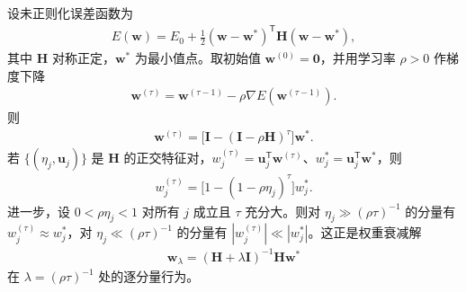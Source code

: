 \documentclass[../../main.tex]{subfiles}
\begin{document}
\begin{theorem}[早停与权重衰减的等价性]\label{theorem:ch09-早停等价}
设未正则化误差函数为
\begin{align*}
E(\boldsymbol{w})=E_{0}+\frac{1}{2}(\boldsymbol{w}-\boldsymbol{w}^{*})^{\mathsf T}\boldsymbol{H}(\boldsymbol{w}-\boldsymbol{w}^{*}),
\end{align*}
其中 $\boldsymbol{H}$ 对称正定，$\boldsymbol{w}^{*}$ 为最小值点。取初始值 $\boldsymbol{w}^{(0)}=\boldsymbol{0}$，并用学习率 $\rho>0$ 作梯度下降
\begin{align*}
\boldsymbol{w}^{(\tau)}=\boldsymbol{w}^{(\tau-1)}-\rho\nabla E(\boldsymbol{w}^{(\tau-1)}).
\end{align*}
则
\begin{align*}
\boldsymbol{w}^{(\tau)}=\bigl[\boldsymbol{I}-(\boldsymbol{I}-\rho\boldsymbol{H})^{\tau}\bigr]\boldsymbol{w}^{*}.
\end{align*}
若 $\{(\eta_{j},\boldsymbol{u}_{j})\}$ 是 $\boldsymbol{H}$ 的正交特征对，$w_{j}^{(\tau)}=\boldsymbol{u}_{j}^{\mathsf T}\boldsymbol{w}^{(\tau)}$、$w_{j}^{*}=\boldsymbol{u}_{j}^{\mathsf T}\boldsymbol{w}^{*}$，则
\begin{align*}
w_{j}^{(\tau)}=\bigl[1-(1-\rho\eta_{j})^{\tau}\bigr]w_{j}^{*}.
\end{align*}
进一步，设 $0<\rho\eta_{j}<1$ 对所有 $j$ 成立且 $\tau$ 充分大。则对 $\eta_{j}\gg(\rho\tau)^{-1}$ 的分量有 $w_{j}^{(\tau)}\approx w_{j}^{*}$，对 $\eta_{j}\ll(\rho\tau)^{-1}$ 的分量有 $|w_{j}^{(\tau)}|\ll|w_{j}^{*}|$。这正是权重衰减解
\begin{align*}
\boldsymbol{w}_{\lambda}=(\boldsymbol{H}+\lambda\boldsymbol{I})^{-1}\boldsymbol{H}\boldsymbol{w}^{*}
\end{align*}
在 $\lambda=(\rho\tau)^{-1}$ 处的逐分量行为。
\end{theorem}
\end{document}
